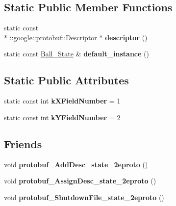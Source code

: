 \subsection*{Static Public Member Functions}
\begin{DoxyCompactItemize}
\item 
\hypertarget{classvss__state_1_1Ball__State_adfc29a0088d19129c759d22494a74443}{static const \\*
\-::google\-::protobuf\-::\-Descriptor $\ast$ {\bfseries descriptor} ()}\label{classvss__state_1_1Ball__State_adfc29a0088d19129c759d22494a74443}

\item 
\hypertarget{classvss__state_1_1Ball__State_a762be08a3ad7dcbec17beb380b860f95}{static const \hyperlink{classvss__state_1_1Ball__State}{Ball\-\_\-\-State} \& {\bfseries default\-\_\-instance} ()}\label{classvss__state_1_1Ball__State_a762be08a3ad7dcbec17beb380b860f95}

\end{DoxyCompactItemize}
\subsection*{Static Public Attributes}
\begin{DoxyCompactItemize}
\item 
\hypertarget{classvss__state_1_1Ball__State_a35cabd2e3579b0e203e5acd1e77cfcad}{static const int {\bfseries k\-X\-Field\-Number} = 1}\label{classvss__state_1_1Ball__State_a35cabd2e3579b0e203e5acd1e77cfcad}

\item 
\hypertarget{classvss__state_1_1Ball__State_a70e818ce92aeb6531c7a163f1b0f2194}{static const int {\bfseries k\-Y\-Field\-Number} = 2}\label{classvss__state_1_1Ball__State_a70e818ce92aeb6531c7a163f1b0f2194}

\end{DoxyCompactItemize}
\subsection*{Friends}
\begin{DoxyCompactItemize}
\item 
\hypertarget{classvss__state_1_1Ball__State_aab1a2c258f8122a403a979ff57e2a706}{void {\bfseries protobuf\-\_\-\-Add\-Desc\-\_\-state\-\_\-2eproto} ()}\label{classvss__state_1_1Ball__State_aab1a2c258f8122a403a979ff57e2a706}

\item 
\hypertarget{classvss__state_1_1Ball__State_a57d9367bc8a7a94ead11d11194cca1b6}{void {\bfseries protobuf\-\_\-\-Assign\-Desc\-\_\-state\-\_\-2eproto} ()}\label{classvss__state_1_1Ball__State_a57d9367bc8a7a94ead11d11194cca1b6}

\item 
\hypertarget{classvss__state_1_1Ball__State_a4e6dc5e8e72799859c4e9556d090e57d}{void {\bfseries protobuf\-\_\-\-Shutdown\-File\-\_\-state\-\_\-2eproto} ()}\label{classvss__state_1_1Ball__State_a4e6dc5e8e72799859c4e9556d090e57d}

\end{DoxyCompactItemize}


